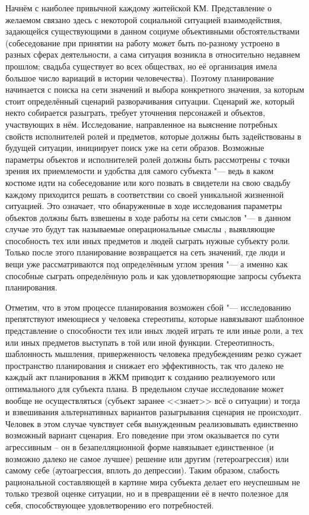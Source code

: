 \documentclass[a4paper, 12pt]{article}
\theoremstyle{plain}
\begin{document}
	Начнём с наиболее привычной каждому житейской КМ. Представление о желаемом связано здесь с некоторой социальной ситуацией взаимодействия, задающейся существующими в данном социуме объективными обстоятельствами (собеседование при принятии на работу может быть по-разному устроено в разных сферах деятельности, а сама ситуация возникла в относительно недавнем прошлом; свадьба существует во всех обществах, но её организация имела большое число вариаций в истории человечества). Поэтому планирование начинается с поиска на сети значений и выбора конкретного значения, за которым стоит определённый сценарий разворачивания ситуации. Сценарий же, который некто собирается разыграть, требует уточнения персонажей и объектов, участвующих в нём. Исследование, направленное на выяснение потребных свойств исполнителей ролей и предметов, которые должны быть задействованы в будущей ситуации, инициирует поиск уже на сети образов. Возможные параметры объектов и исполнителей ролей должны быть рассмотрены с точки зрения их приемлемости и удобства для самого субъекта "--- ведь в каком костюме идти на собеседование или кого позвать в свидетели на свою свадьбу каждому приходится решать в соответствии со своей уникальной жизненной ситуацией. Это означает, что обнаруженные в ходе исследования параметры объектов должны быть взвешены в ходе работы на сети смыслов "--- в данном случае это будут так называемые операциональные смыслы \cite{Tikhomirov2002}, выявляющие способность тех или иных предметов и людей сыграть нужные субъекту роли. Только после этого планирование возвращается на сеть значений, где люди и вещи уже рассматриваются под определённым углом зрения "--- а именно как способные сыграть определённую роль и как удовлетворяющие запросы субъекта планирования.
	
	Отметим, что в этом процессе планирования возможен сбой "--- исследованию препятствуют имеющиеся у человека стереотипы, которые навязывают шаблонное представление о способности тех или иных людей играть те или иные роли, а тех или иных предметов выступать в той или иной функции. Стереотипность, шаблонность мышления, приверженность человека предубеждениям резко сужает пространство планирования и снижает его эффективность, так что далеко не каждый акт планирования в ЖКМ приводит к созданию реализуемого или оптимального для субъекта плана. В предельном случае исследование может вообще не осуществляться (субъект заранее <<знает>> всё о ситуации) и тогда и взвешивания альтернативных вариантов разыгрывания сценария не происходит. Человек в этом случае чувствует себя вынужденным реализовывать единственно возможный вариант сценария. Его поведение при этом оказывается по сути агрессивным – он в безапелляционной форме навязывает единственное (и возможно далеко не самое лучшее) решение или другим (гетероагрессия) или самому себе (аутоагрессия, вплоть до депрессии). Таким образом, слабость рациональной составляющей в картине мира субъекта делает его неуспешным не только трезвой оценке ситуации, но и в превращении её в нечто полезное для себя, способствующее удовлетворению его потребностей.
	
\end{document}
